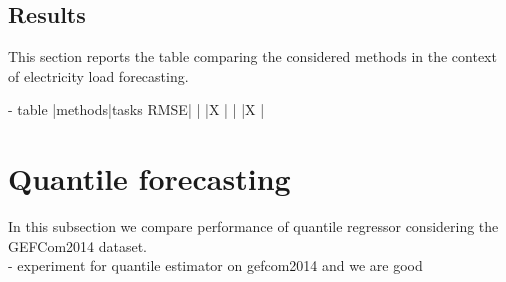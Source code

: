 \subsection{Results}
This section reports the table comparing the considered methods in the context of electricity load forecasting.

- table 
|methods|tasks RMSE|
|       |X          |       
|       |X          |       

\section{Quantile forecasting}
In this subsection we compare performance of quantile regressor considering the GEFCom2014 dataset.
\\
- experiment for quantile estimator on gefcom2014 and we are good
